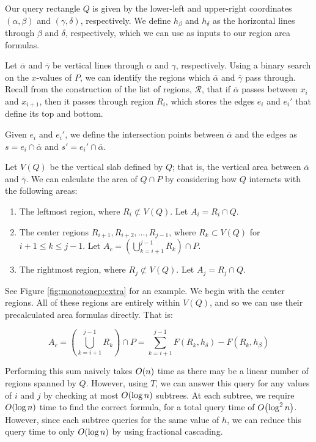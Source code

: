 Our query rectangle $Q$ is given by the lower-left and upper-right coordinates $(\alpha, \beta)$ and $(\gamma, \delta)$, respectively. We define $h_\beta$ and $h_\delta$ as the horizontal lines through $\beta$ and $\delta$, respectively, which we can use as inputs to our region area formulas.

Let $\overline{\alpha}$ and $\overline{\gamma}$ be vertical lines through $\alpha$ and $\gamma$, respectively. Using a binary search on the $x$-values of $P$, we can identify the regions which $\overline{\alpha}$ and $\overline{\gamma}$ pass through. Recall from the construction of the list of regions, $\mathcal{R}$, that if $\overline{\alpha}$ passes between $x_i$ and $x_{i+1}$, then it passes through region $R_i$, which stores the edges $e_i$ and $e_i'$ that define its top and bottom.

Given $e_i$ and $e_i'$, we define the intersection points between $\overline{\alpha}$ and the edges as $s = e_i \cap \overline{\alpha}$ and $s' = e_i' \cap \overline{\alpha}$.

Let $V(Q)$ be the vertical slab defined by $Q$; that is, the vertical area between $\overline{\alpha}$ and $\overline{\gamma}$. We can calculate the area of $Q \cap P$ by considering how $Q$ interacts with the following areas:

\begin{enumerate}
 \item The leftmost region, where $R_i \not \subset V(Q)$. Let $A_i = R_i \cap Q$.
 \item The center regions $R_{i+1}, R_{i+2}, \ldots, R_{j-1}$, where  $R_k \subset V(Q)$ for $i + 1 \leq k \leq j -1$. Let $A_c = \left ( \bigcup_{k=i+1}^{j-1}{R_k} \right ) \cap P $.
 \item The rightmost region, where $R_j \not \subset V(Q)$. Let $A_j = R_j \cap Q$. 
\end{enumerate}

See Figure \ref{fig:monotonep:extra} for an example. We begin with the center regions. All of these regions are entirely within $V(Q)$, and so we can use their precalculated area formulas directly. That is:

\[
A_c
= \left ( \bigcup_{k=i+1}^{j-1}{R_k} \right ) \cap P 
= \sum_{k=i+1}^{j-1} F(R_k, h_\delta) - F(R_k, h_\beta)
\]

Performing this sum naively takes $O\!\left(n\right)$ time as there may be a linear number of regions spanned by $Q$.  However, using $T$, we can answer this query for any values of $i$ and $j$ by checking at most $O\!\left(\log{n}\right)$ subtrees. At each subtree, we require $O\!\left(\log{n}\right)$ time to find the correct formula, for a total query time of $O\!\left(\log^2{n}\right)$.  However, since each subtree queries for the same value of $h$, we can reduce this query time to only $O\!\left(\log{n}\right)$ by using fractional cascading.\cite{cg-fc-86, cg-fc2-86}

